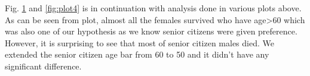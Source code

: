 \begin{figure}
\begin{minipage}{.5\textwidth}
  \label{fig:plot2}
\end{minipage}
\end{figure}

Fig. \ref{fig:plot2} and \ref{fig:plot4} is in continuation with analysis done in various plots above. As can be seen from plot, almost all the females survived who have age>60 which was also one of our hypothesis as we know senior citizens were given preference. However, it is surprising to see that most of senior citizen males died. We extended the senior citizen age bar from 60 to 50 and it didn't have any significant difference.
